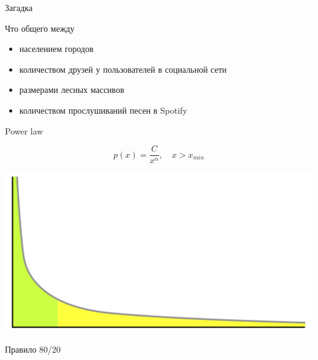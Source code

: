 \documentclass[11pt,aspectratio=169,handout]{beamer}
\begin{document}
\begin{frame}{Загадка}

Что общего между
\begin{itemize}
\item населением городов
\item количеством друзей у пользователей в социальной сети
\item размерами лесных массивов
\item количеством прослушиваний песен в Spotify
\end{itemize}

\end{frame}

\begin{frame}{Power law}

\[
p(x) = \frac{C} {x^{\alpha}}, \quad x > x_{min}
\]

\begin{center}
\includegraphics[scale=0.25]{images/longtail.png}

Правило 80/20
\end{center}

\end{frame}
\end{document}
